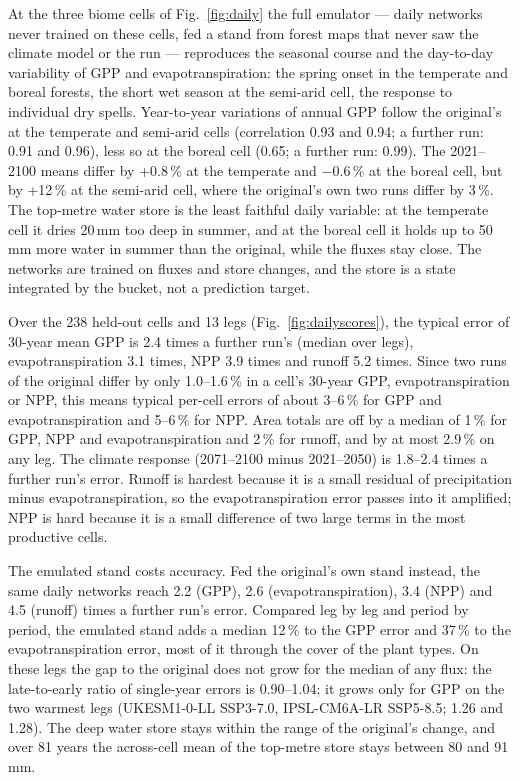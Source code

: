 \documentclass[11pt,a4paper]{article}
\begin{document}
At the three biome cells of Fig.~\ref{fig:daily} the full emulator --- daily networks never trained on these cells,
fed a stand from forest maps that never saw the climate model or the run --- reproduces the seasonal course and the
day-to-day variability of GPP and evapotranspiration: the spring onset in the temperate and boreal forests, the short
wet season at the semi-arid cell, the response to individual dry spells. Year-to-year variations of annual GPP follow
the original's at the temperate and semi-arid cells (correlation 0.93 and 0.94; a further run: 0.91 and 0.96), less so
at the boreal cell (0.65; a further run: 0.99). The 2021--2100 means differ by +0.8\,\% at the temperate and
$-0.6$\,\% at the boreal cell, but by +12\,\% at the semi-arid cell, where the original's own two runs differ by
3\,\%. The top-metre water store is the least faithful daily variable: at the temperate cell it dries 20\,mm too deep
in summer, and at the boreal cell it holds up to 50\,mm more water in summer than the original, while the fluxes stay
close. The networks are trained on fluxes and store changes, and the store is a state integrated by the bucket, not a
prediction target.

Over the 238 held-out cells and 13 legs (Fig.~\ref{fig:dailyscores}), the typical error of 30-year mean GPP is 2.4
times a further run's (median over legs), evapotranspiration 3.1 times, NPP 3.9 times and runoff 5.2 times. Since two
runs of the original differ by only 1.0--1.6\,\% in a cell's 30-year GPP, evapotranspiration or NPP, this means typical
per-cell errors of about 3--6\,\% for GPP and evapotranspiration and 5--6\,\% for NPP. Area totals are off by a median
of 1\,\% for GPP, NPP and evapotranspiration and 2\,\% for runoff, and by at most 2.9\,\% on any leg. The climate
response (2071--2100 minus 2021--2050) is 1.8--2.4 times a further run's error. Runoff is hardest because it is a small
residual of precipitation minus evapotranspiration, so the evapotranspiration error passes into it amplified; NPP is
hard because it is a small difference of two large terms in the most productive cells.

The emulated stand costs accuracy. Fed the original's own stand instead, the same daily networks reach 2.2 (GPP), 2.6
(evapotranspiration), 3.4 (NPP) and 4.5 (runoff) times a further run's error. Compared leg by leg and period by period,
the emulated stand adds a median 12\,\% to the GPP error and 37\,\% to the evapotranspiration error, most of it through
the cover of the plant types. On these legs the gap to the original does not grow for the median of any flux: the
late-to-early ratio of single-year errors is 0.90--1.04; it grows only for GPP on the two warmest legs (UKESM1-0-LL
SSP3-7.0, IPSL-CM6A-LR SSP5-8.5; 1.26 and 1.28). The deep water store stays within the range of the original's
change, and over 81 years the across-cell mean of the top-metre store stays between 80 and 91\,mm.
\end{document}
